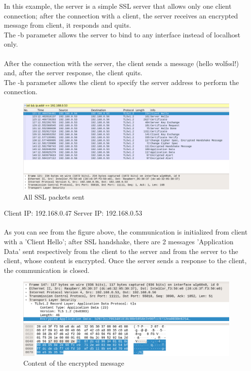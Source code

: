 \documentclass[a4paper,12pt]{report}
\begin{document}
In this example, the server is a simple SSL server that allows only one client connection; after the connection with a client, the server receives an encrypted message from client, it responds and quits.
\\The -b parameter allows the server to bind to any interface instead of localhost only.
\\
\\After the connection with the server, the client sends a message (hello wolfssl!) and, after the server response, the client quits.
\\The -h parameter allows the client to specify the server address to perform the connection.

\begin{figure}[H]
    \centering
    \includegraphics[scale=0.22]{test/examples/client-server/wireshark1.png}
    \caption{All SSL packets sent}
    
\end{figure}
Client IP:  192.168.0.47 \hspace{4cm} Server IP: 192.168.0.53\\ \\
As you can see from the figure above, the communication is initialized from client with a 'Client Hello'; after SSL handshake, there are 2 messages 'Application Data' sent respectively from the client to the server and from the server to the client, whose content is encrypted. Once the server sends a response to the client, the communication is closed.

\begin{figure}[H]
    \centering
    \includegraphics[scale=0.27]{test/examples/client-server/encrypted_data.png}
    \caption{Content of the encrypted message}
    
\end{figure}
\end{document}
